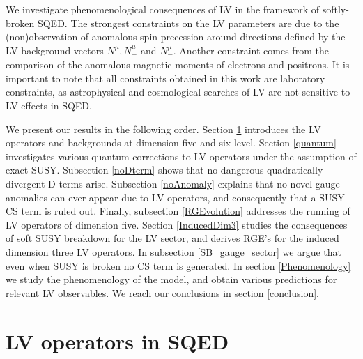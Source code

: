 \documentclass[12pt]{revtex4}
\begin{document}
We investigate phenomenological consequences of LV in the framework of
softly-broken SQED. The strongest constraints on the LV parameters are
due to the (non)observation of anomalous spin precession
around directions defined by the LV background vectors $N^\mu,
N_+^\mu$ and $N_-^\mu$. Another constraint comes from the
comparison of the anomalous magnetic moments of electrons and  
positrons. It is important to note that all constraints obtained in this 
work are laboratory constraints, as astrophysical and cosmological 
searches of LV are not sensitive to LV effects in SQED. 


We present our results in the following order. Section \ref{LVoperators} 
introduces the LV operators and backgrounds at dimension five and six
level. Section \ref{quantum} investigates various quantum corrections
to LV operators under the assumption of exact SUSY. Subsection
\ref{noDterm} shows that no dangerous quadratically divergent D-terms
arise. Subsection \ref{noAnomaly} explains that no novel gauge
anomalies can ever appear due to LV operators, and consequently that
a SUSY CS term is ruled out. Finally, subsection \ref{RGEvolution}
addresses the running of LV operators of dimension five. Section
\ref{InducedDim3} studies the consequences of soft SUSY breakdown for
the LV sector, and derives RGE's for the induced dimension three LV
operators. In subsection \ref{SB_gauge_sector} we argue that even when
SUSY is broken no CS term is generated. In section \ref{Phenomenology}
we study the phenomenology of the model, and obtain various
predictions for relevant LV observables.  We reach our conclusions in
section \ref{conclusion}.   


\section{LV operators in SQED} 
\label{LVoperators}
\end{document}

